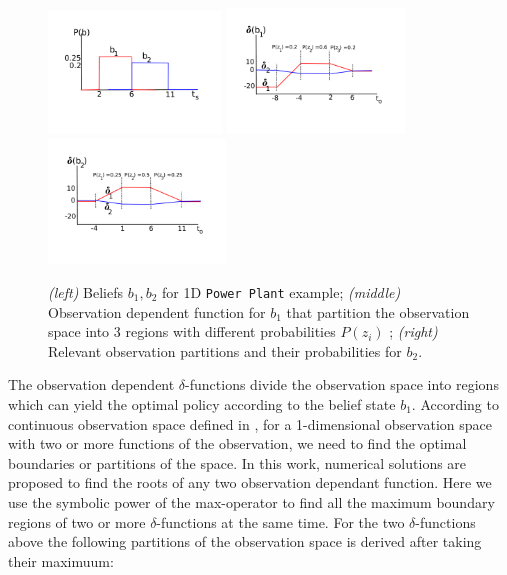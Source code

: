 \documentclass{article} %
\begin{document}
\begin{figure}[tbp!]
\vspace{-6mm}
\centering
\hspace{-17mm}
\includegraphics[width=0.41\textwidth]{pics/beliefs.pdf}
\hspace{-12mm}
\includegraphics[width=0.42\textwidth]{pics/delta1.pdf}
\hspace{-12mm}
\includegraphics[width=0.42\textwidth]{pics/delta2.pdf}
\hspace{-17mm}
\vspace{-10mm}
\caption{\footnotesize 
{\it (left)} Beliefs $b_1,b_2$ for 1D \texttt{Power Plant} example; 
{\it (middle)} Observation dependent function for $b_1$ that partition the observation space into 3 regions with different probabilities $P(z_i)$ ; 
{\it (right)} Relevant observation partitions and their probabilities for $b_2$.
}
\label{fig:timeSpace}
\vspace{-4mm}
\end{figure}
The observation dependent $\delta$-functions divide the observation space into regions which can yield the optimal policy according to the belief state $b_1$. According to continuous observation space defined in \cite{pascal_ijcai05}, for a 1-dimensional observation space with two or more functions of the observation, we need to find the optimal boundaries or partitions of the space. In this work, numerical solutions are proposed to find the roots of any two observation dependant function. Here we use the symbolic power of the max-operator to find all the maximum boundary regions of two or more $\delta$-functions at the same time. For the two $\delta$-functions above the following partitions of the observation space is derived after taking their maximuum: 
\end{document}
